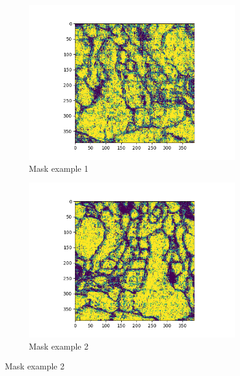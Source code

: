 \begin{figure}[h]
     \centering
     \begin{subfigure}[b]{0.3\textwidth}
         \centering
         \includegraphics[width=1.4\textwidth]{../openreview/figs/output_43.png}
         \caption{Mask example 1}
     \end{subfigure}
     \hfill
     \begin{subfigure}[b]{0.3\textwidth}
         \centering
         \includegraphics[width=1.4\textwidth]{../openreview/figs/output_27.png}
         \caption{Mask example 2}
     \end{subfigure}
     \hfill
\end{figure}